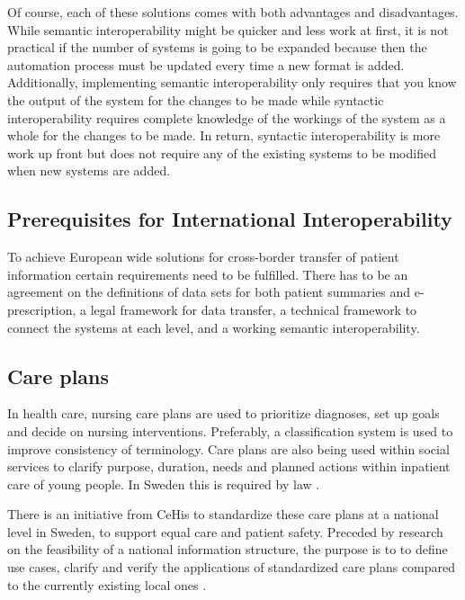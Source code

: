 \documentclass[14pt]{article}
\begin{document}
Of course, each of these solutions comes with both advantages and disadvantages.  While semantic interoperability might be quicker and less work at first, it is not practical if the number of systems is going to be expanded because then the automation process must be updated every time a new format is added.  Additionally, implementing semantic interoperability only requires that you know the output of the system for the changes to be made while syntactic interoperability requires complete knowledge of the workings of the system as a whole for the changes to be made.  In return, syntactic interoperability is more work up front but does not require any of the existing systems to be modified when new systems are added.

\subsection{Prerequisites for International Interoperability}

To achieve European wide solutions for cross-border transfer of patient information certain requirements need to be fulfilled. There has to be an agreement on the definitions of data sets for both patient summaries and e-prescription, a legal framework for data transfer, a technical framework to connect the systems at each level, and a working semantic \gls{interoperability}. \cite{epSOS1}

\subsection{Care plans}
In health care, nursing care plans are used to prioritize diagnoses, set up goals and decide on nursing interventions. Preferably, a classification system is used to improve consistency of terminology. Care plans are also being used within social services to clarify purpose, duration, needs and planned actions within inpatient care of young people. In Sweden this is required by law \cite{SocialServices}.

There is an initiative from \gls{CeHis} to standardize these care plans at a national level in Sweden, to support equal care and patient safety. Preceded by research on the feasibility of a national information structure, the purpose is to to define use cases, clarify and verify the applications of standardized care plans compared to the currently existing local ones \cite{CeHis}.
\end{document}

